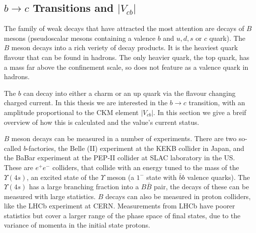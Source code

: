 \subsection{$b\to c$ Transitions and $|V_{cb}|$}

The family of weak decays that have attracted the most attention are decays of $B$ mesons (pseudoscalar mesons containing a valence $b$ and $u,d,s$ or $c$ quark). The $B$ meson decays into a rich veriety of decay products. It is the heaviest quark flavour that can be found in hadrons. The only heavier quark, the top quark, has a mass far above the confinement scale, so does not feature as a valence quark in hadrons.

The $b$ can decay into either a charm or an up quark via the flavour changing charged current. In this thesis we are interested in the $b\to c$ transition, with an amplitude proportional to the CKM element $|V_{cb}|$. In this section we give a breif overview of how this is calculated and the value's current status.

$B$ meson decays can be measured in a number of experiments. There are two so-called $b$-factories, the Belle (II) experiment at the KEKB collider in Japan, and the BaBar experiment at the PEP-II collider at SLAC laboratory in the US. These are $e^+e^-$ colliders, that collide with an energy tuned to the mass of the $\Upsilon(4s)$, an excited state of the $\Upsilon$ meson (a $1^-$ state with $\bar{b}b$ valence quarks). The $\Upsilon(4s)$ has a large branching fraction into a $B\bar{B}$ pair, the decays of these can be measured with large statistics. $B$ decays can also be measured in proton colliders, like the LHCb experiment at CERN. Measurements from LHCb have poorer statistics but cover a larger range of the phase space of final states, due to the variance of momenta in the initial state protons.

